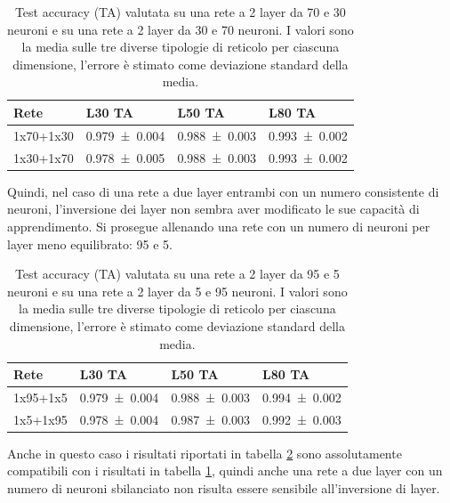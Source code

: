 \documentclass{article}
\begin{document}
\begin{table}[ht]
\begin{center}
\begin{tabular}{llll}
\toprule
Rete & L30 TA & L50 TA & L80 TA\\
\midrule
1x70+1x30 & \num{0.979 \pm 0.004} & \num{0.988 \pm 0.003} & \num{0.993 \pm 0.002} \\
1x30+1x70 & \num{0.978 \pm 0.005} & \num{0.988 \pm 0.003} & \num{0.993 \pm 0.002} \\
\bottomrule
\end{tabular}
\end{center}
\caption{Test accuracy (TA) valutata su una rete a 2 layer da 70 e 30 neuroni e su una rete a 2 layer da 30 e 70 neuroni. I valori sono la media sulle tre diverse tipologie di reticolo per ciascuna dimensione, l'errore è stimato come deviazione standard della media.}
\label{tab:2LN30-70}
\end{table}

Quindi, nel caso di una rete a due layer entrambi con un numero consistente di neuroni, l'inversione dei layer non sembra aver modificato le sue capacità di apprendimento.
Si prosegue allenando una rete con un numero di neuroni per layer meno equilibrato: 95 e 5.

\begin{table}[ht]
\begin{center}
\begin{tabular}{llll}
\toprule
Rete & L30 TA & L50 TA & L80 TA \\
\midrule
1x95+1x5 & \num{0.979 \pm 0.004} & \num{0.988 \pm 0.003} & \num{0.994 \pm 0.002} \\
1x5+1x95 & \num{0.978 \pm 0.004} & \num{0.987 \pm 0.003} & \num{0.992 \pm 0.003} \\
\bottomrule
\end{tabular}
\end{center}
\caption{Test accuracy (TA) valutata su una rete a 2 layer da 95 e 5 neuroni e su una rete a 2 layer da 5 e 95 neuroni. I valori sono la media sulle tre diverse tipologie di reticolo per ciascuna dimensione, l'errore è stimato come deviazione standard della media.}
\label{tab:2LN5-95}
\end{table}

Anche in questo caso i risultati riportati in tabella \ref{tab:2LN5-95} sono assolutamente compatibili con i risultati in tabella \ref{tab:2LN30-70}, quindi anche una rete a due layer con un numero di neuroni sbilanciato non risulta essere sensibile all'inversione di layer.
\end{document}
